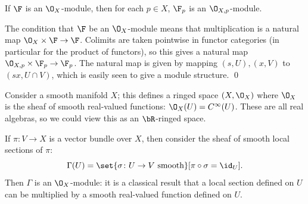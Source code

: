 \bprop

    If $\F$ is an $\O_X$-module, then for each $p\in X$, $\F_p$ is an $\O_{X,p}$-module.

\eprop

\bproof

    The condition that $\F$ be an $\O_X$-module means that multiplication is a natural map $\O_X\times\F\to\F$.
    Colimits are taken pointwise in functor categories (in particular for the product of functors), so this gives a natural map
    $\O_{X,p}\times\F_p\to\F_p$.
    The natural map is given by mapping $(s,U),(x,V)$ to $(sx,U\cap V)$, which is easily seen to give a module structure.
    \qed

\eproof

\bexam

    Consider a smooth manifold $X$; this defines a ringed space $(X,\O_X)$ where $\O_X$ is the sheaf of smooth real-valued functions:
    $\O_X(U)=C^\infty(U)$.
    These are all real algebras, so we could view this as an $\bR$-ringed space.

    If $\pi\colon V\to X$ is a vector bundle over $X$, then consider the sheaf of smooth local sections of $\pi$:
    $$ \Gamma(U) = \set{\sigma\colon U\to V\hbox{ smooth}}[\pi\circ\sigma=\id_U] . $$
    Then $\Gamma$ is an $\O_X$-module: it is a classical result that a local section defined on $U$ can be multiplied by a smooth real-valued
    function defined on $U$.

\eexam

